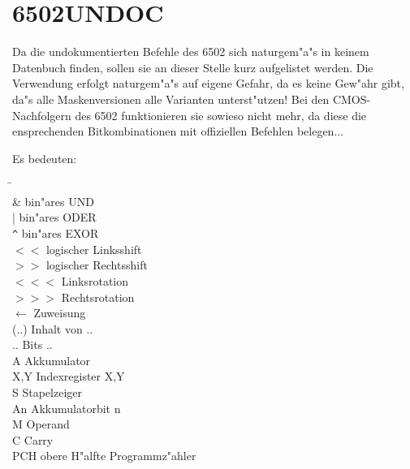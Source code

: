 \documentclass[12pt,a4paper,twoside]{report}
\begin{document}
{%

\section{6502UNDOC}

Da die undokumentierten Befehle des 6502 sich naturgem"a"s in keinem
Datenbuch finden, sollen sie an dieser Stelle kurz aufgelistet werden.
Die Verwendung erfolgt naturgem"a"s auf eigene Gefahr, da es keine
Gew"ahr gibt, da"s alle Maskenversionen alle Varianten unterst"utzen!
Bei den CMOS-Nachfolgern des 6502 funktionieren sie sowieso nicht
mehr, da diese die ensprechenden Bitkombinationen mit offiziellen Befehlen
belegen...

\clearpage

Es bedeuten:

\begin{tabbing}
\hspace{2cm} \= \kill \\
\&             \> bin"ares UND \\
|              \> bin"ares ODER \\
\verb!^!       \> bin"ares EXOR \\
$<<$           \> logischer Linksshift \\
$>>$           \> logischer Rechtsshift \\
$<<<$          \> Linksrotation \\
$>>>$          \> Rechtsrotation \\
$\leftarrow$   \> Zuweisung \\
(..)           \> Inhalt von .. \\
{..}           \> Bits .. \\
A              \> Akkumulator \\
X,Y            \> Indexregister X,Y \\
S              \> Stapelzeiger \\
An             \> Akkumulatorbit n \\
M              \> Operand \\
C              \> Carry \\
PCH            \> obere H"alfte Programmz"ahler \\
\end{tabbing}

}
\end{document}
